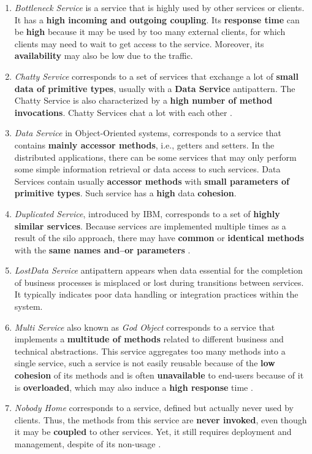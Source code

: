 \documentclass[12pt, times]{article}
\begin{document}
	\begin{enumerate}
		\item \textit{Bottleneck Service} is a service that is highly used by other services or clients. It has a \textbf{high incoming and outgoing coupling}. Its \textbf{response time} can be \textbf{high} because it may be used by too many external clients, for which clients may need to wait to get access to the service. Moreover, its \textbf{availability} may also be low due to the traffic.
		\item \textit{Chatty Service} corresponds to a set of services that exchange a lot of \textbf{small data of primitive types}, usually with a \textbf{Data Service} antipattern. The Chatty Service is also characterized by a \textbf{high number of method invocations}. Chatty Services chat a lot with each other \cite{book_1}.
		\item \textit{ Data Service} in Object-Oriented \cite{book_2} systems, corresponds to a service that contains \textbf{mainly accessor methods}, i.e., getters and setters. In the distributed applications, there can be some services that may only perform some simple information retrieval or data access to such services. Data Services contain usually \textbf{accessor methods} with \textbf{small parameters of primitive types}. Such service has a \textbf{high} data \textbf{cohesion}.
		\item \textit{Duplicated Service}, introduced by IBM, corresponds to a set of \textbf{highly similar services}. Because services are implemented multiple times as a result of the silo approach, there may have \textbf{common} or \textbf{identical methods} with the \textbf{same names and–or parameters} \cite{duplicated_service}.
		\item \textit{LostData Service} antipattern appears when data essential for the completion of business processes is misplaced or lost during transitions between services. It typically indicates poor data handling or integration practices within the system.
		\item \textit{Multi Service} also known as \textit{God Object} corresponds to a service that implements a \textbf{multitude of methods} related to different business and technical abstractions. This service aggregates too many methods into a single service, such a service is not easily reusable because of the \textbf{low cohesion} of its methods and is often \textbf{unavailable} to end-users because of it is \textbf{overloaded}, which may also induce a \textbf{high response} time \cite{book_1}.
		\item \textit{Nobody Home} corresponds to a service, defined but actually never used by clients. Thus, the methods from this service are \textbf{never invoked}, even though it may be \textbf{coupled} to other services. Yet, it still requires deployment and management, despite of its non-usage \cite{nobody_home}.

\end{enumerate}
\end{document}
